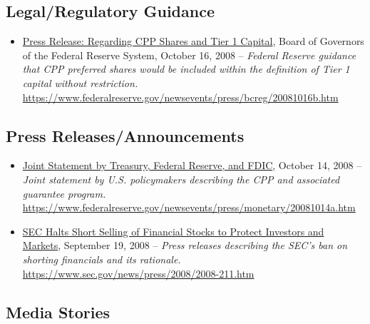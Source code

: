 \documentclass[12pt]{article}
\begin{document}
\subsection{Legal/Regulatory Guidance}

\begin{itemize}
\item
\ul{Press Release: Regarding CPP Shares and Tier 1 Capital}, Board of Governors of the Federal Reserve System, October 16, 2008 -- \emph{Federal Reserve guidance that CPP preferred shares would be included within the definition of Tier 1 capital without restriction.} \url{https://www.federalreserve.gov/newsevents/press/bcreg/20081016b.htm}

\end{itemize}

\subsection{Press Releases/Announcements}

\begin{itemize}
 \item
 \ul{Joint Statement by Treasury, Federal Reserve, and FDIC}, October 14, 2008 -- \emph{Joint statement by U.S. policymakers describing the CPP and associated guarantee program.} \url{https://www.federalreserve.gov/newsevents/press/monetary/20081014a.htm}
 \item
 \ul{SEC Halts Short Selling of Financial Stocks to Protect Investors and Markets}, September 19, 2008 -- \emph{Press releases describing the SEC's ban on shorting financials and its rationale.} \url{https://www.sec.gov/news/press/2008/2008-211.htm}

\end{itemize}

\subsection{Media Stories}
\end{document}
